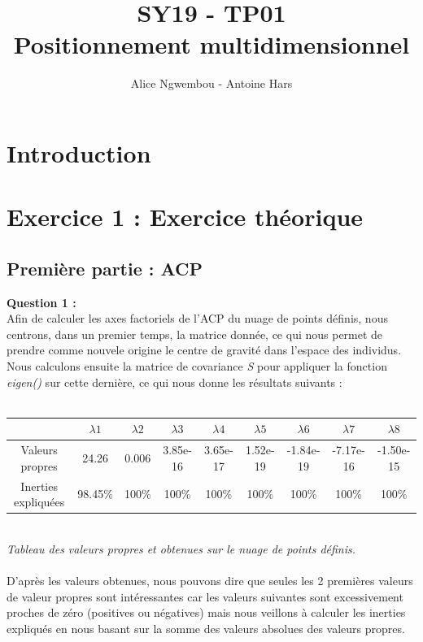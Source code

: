 \documentclass[a4paper, 10pt]{article}
\title{SY19 - TP01\\Positionnement multidimensionnel}
\author{Alice Ngwembou - Antoine Hars}
\begin{document}
\maketitle

\section*{Introduction}

\section*{Exercice 1 : Exercice théorique}
\subsection*{Première partie : ACP}
\textbf{Question 1 :}\\
Afin de calculer les axes factoriels de l'ACP du nuage de points définis, nous centrons, dans un premier temps, la matrice donnée,
ce qui nous permet de prendre comme nouvele origine le centre de gravité dans l'espace des individus.\\
Nous calculons ensuite la matrice de covariance \textit{S} pour appliquer la fonction \textit{eigen()} sur cette dernière,
ce qui nous donne les résultats suivants :\\ \\
\begin{tabular}{|c|c|c|c|c|c|c|c|c|}
\hline
 & $\lambda1$ & $\lambda2$ & $\lambda3$ & $\lambda4$ & $\lambda5$ & $\lambda6$ & $\lambda7$ & $\lambda8$ \\
\hline
Valeurs propres & 24.26 & 0.006 & 3.85e-16 & 3.65e-17 & 1.52e-19 & -1.84e-19 & -7.17e-16 & -1.50e-15 \\
\hline
Inerties expliquées & 98.45\% & 100\% & 100\% & 100\% & 100\% & 100\% & 100\% & 100\% \\
\hline
\end{tabular}\\
\textit{Tableau des valeurs propres et obtenues sur le nuage de points définis.}\\ \\
D'après les valeurs obtenues, nous pouvons dire que seules les 2 premières valeurs de valeur propres sont intéressantes car les valeurs
suivantes sont excessivement proches de zéro (positives ou négatives) mais nous veillons à calculer les inerties expliqués en nous
basant sur la somme des valeurs absolues des valeurs propres.\\
\end{document}
